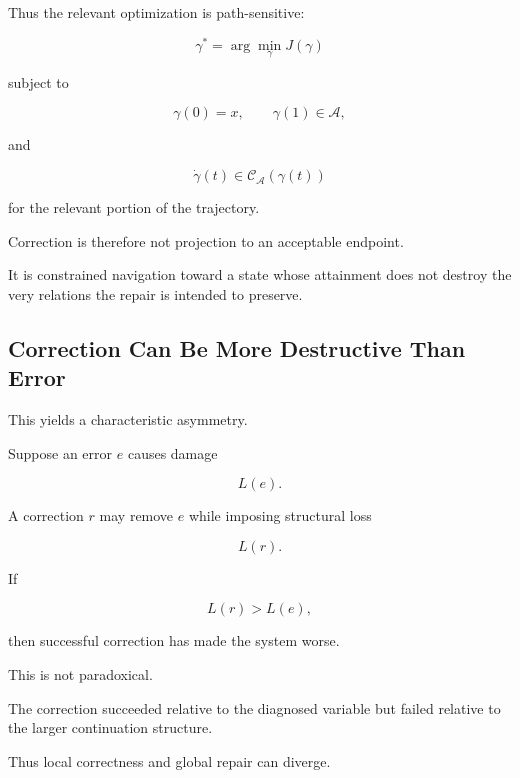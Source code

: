 \documentclass[11pt]{article}
\theoremstyle{remark}
\newcommand{\Adm}{\mathcal{A}}
\begin{document}
Thus the relevant optimization is path-sensitive:

\begin{equation}
\gamma^\ast
=
\arg\min_{\gamma}
J(\gamma)
\end{equation}

subject to

\begin{equation}
\gamma(0)=x,
\qquad
\gamma(1)\in\mathcal{A},
\end{equation}

and

\begin{equation}
\dot{\gamma}(t)
\in
\mathcal{C}_{\Adm}(\gamma(t))
\end{equation}

for the relevant portion of the trajectory.

Correction is therefore not projection to an acceptable endpoint.

It is constrained navigation toward a state whose attainment does not destroy the very relations the repair is intended to preserve.

\subsection{Correction Can Be More Destructive Than Error}

This yields a characteristic asymmetry.

Suppose an error $e$ causes damage

\begin{equation}
L(e).
\end{equation}

A correction $r$ may remove $e$ while imposing structural loss

\begin{equation}
L(r).
\end{equation}

If

\begin{equation}
L(r)>L(e),
\end{equation}

then successful correction has made the system worse.

This is not paradoxical.

The correction succeeded relative to the diagnosed variable but failed relative to the larger continuation structure.

Thus local correctness and global repair can diverge.
\end{document}
